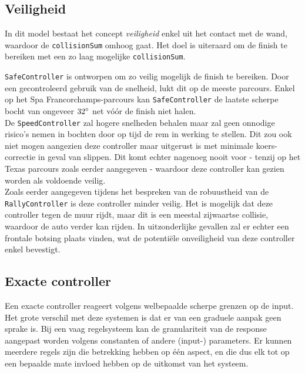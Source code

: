 \documentclass[10pt,a4paper]{article}
\begin{document}
		\subsection{Veiligheid}
			In dit model bestaat het concept \textit{veiligheid} enkel uit het contact met de wand, waardoor de \texttt{collisionSum} omhoog gaat. Het doel is uiteraard om de finish te bereiken met een zo laag mogelijke \texttt{collisionSum}.

			\texttt{SafeController} is ontworpen om zo veilig mogelijk de finish te bereiken. Door een gecontroleerd gebruik van de snelheid, lukt dit op de meeste parcours. Enkel op het Spa Francorchamps-parcours kan \texttt{SafeController} de laatste scherpe bocht van ongeveer $32 \degree$ net v\'o\'or de finish niet halen.\\

			De \texttt{SpeedController} zal hogere snelheden behalen maar zal geen onnodige risico's nemen in bochten door op tijd de rem in werking te stellen. Dit zou ook niet mogen aangezien deze controller maar uitgerust is met minimale koers-correctie in geval van slippen. Dit komt echter nagenoeg nooit voor - tenzij op het Texas parcours zoals eerder aangegeven - waardoor deze controller kan gezien worden als voldoende veilig.\\

			Zoals eerder aangegeven tijdens het bespreken van de robuustheid van de \texttt{RallyController} is deze controller minder veilig. Het is mogelijk dat deze controller tegen de muur rijdt, maar dit is een meestal zijwaartse collisie, waardoor de auto verder kan rijden. In uitzonderlijke gevallen zal er echter een frontale botsing plaats vinden, wat de potenti\"ele onveiligheid van deze controller enkel bevestigt.\\

		\subsection{Exacte controller}
			Een exacte controller reageert volgens welbepaalde scherpe grenzen op de input. Het grote verschil met deze systemen is dat er van een graduele aanpak geen sprake is. Bij een vaag regelsysteem kan de granulariteit van de response aangepast worden volgens constanten of andere (input-) parameters. Er kunnen meerdere regels zijn die betrekking hebben op \'e\'en aspect, en die dus elk tot op een bepaalde mate invloed hebben op de uitkomst van het systeem. \\
\end{document}
